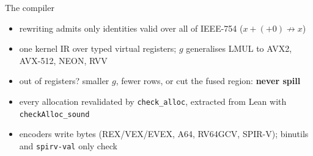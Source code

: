 \documentclass[aspectratio=169,11pt]{beamer}
\begin{document}
\begin{frame}{The compiler}
\centering
{}

\vspace{0.8em}
\begin{itemize}
\item rewriting admits only identities valid over all of IEEE-754 ($x+(+0) \not\to x$)
\item one kernel IR over typed virtual registers; $g$ generalises LMUL to AVX2, AVX-512, NEON, RVV
\item out of registers? smaller $g$, fewer rows, or cut the fused region: \textbf{never spill}
\item every allocation revalidated by \texttt{check\_alloc}, extracted from Lean with \texttt{checkAlloc\_sound}
\item encoders write bytes (REX/VEX/EVEX, A64, RV64GCV, SPIR-V); binutils and \texttt{spirv-val} only check
\end{itemize}
\end{frame}
\end{document}
